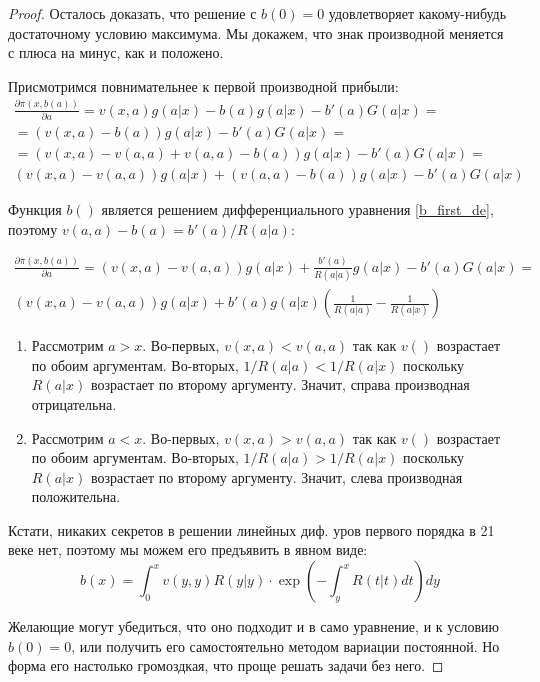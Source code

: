 \begin{itemize}
\begin{proof}
Осталось доказать, что решение с $ b(0)=0 $ удовлетворяет какому-нибудь достаточному условию максимума. Мы докажем, что знак производной меняется с плюса на минус, как и положено.


Присмотримся повнимательнее к первой производной прибыли:
\begin{multline}
\frac{\partial \pi(x,b(a))}{\partial a}=v(x,a)g(a|x)-b(a)g(a|x)-b'(a)G(a|x)=\\
=(v(x,a)-b(a))g(a|x)-b'(a)G(a|x)=\\
=(v(x,a)-v(a,a)+v(a,a)-b(a))g(a|x)-b'(a)G(a|x)=\\
(v(x,a)-v(a,a))g(a|x)+(v(a,a)-b(a))g(a|x)-b'(a)G(a|x)
\end{multline}

Функция $ b() $ является решением дифференциального уравнения \ref{b_first_de}, поэтому $ v(a,a)-b(a)=b'(a)/R(a|a) $:

\begin{multline}
\frac{\partial \pi(x,b(a))}{\partial a}=(v(x,a)-v(a,a))g(a|x)+\frac{b'(a)}{R(a|a)}g(a|x)-b'(a)G(a|x)=\\
(v(x,a)-v(a,a))g(a|x)+b'(a)g(a|x)\left(\frac{1}{R(a|a)}-\frac{1}{R(a|x)} \right)
\end{multline}

\begin{enumerate}
\item Рассмотрим $ a>x $. Во-первых, $ v(x,a)<v(a,a) $ так как $ v() $ возрастает по обоим аргументам. Во-вторых, $1/R(a|a)<1/R(a|x) $ поскольку $ R(a|x) $ возрастает по второму аргументу. Значит, справа производная отрицательна.
\item Рассмотрим $ a<x $. Во-первых, $ v(x,a)>v(a,a) $ так как $ v() $ возрастает по обоим аргументам. Во-вторых, $1/R(a|a)>1/R(a|x) $ поскольку $ R(a|x) $ возрастает по второму аргументу. Значит, слева производная положительна.
\end{enumerate}

Кстати, никаких секретов в решении линейных диф. уров первого порядка в 21 веке нет, поэтому мы можем его предъявить в явном виде:
\begin{equation}
b(x)=\int_{0}^{x}v(y,y)R(y|y)\cdot \exp\left(-\int_{y}^{x}R(t|t)dt\right) dy
\end{equation}

Желающие могут убедиться, что оно подходит и в само уравнение, и к условию $ b(0)=0 $, или получить его самостоятельно методом вариации постоянной. Но форма его настолько громоздкая, что проще решать задачи без него.
\end{proof}


\end{itemize}
